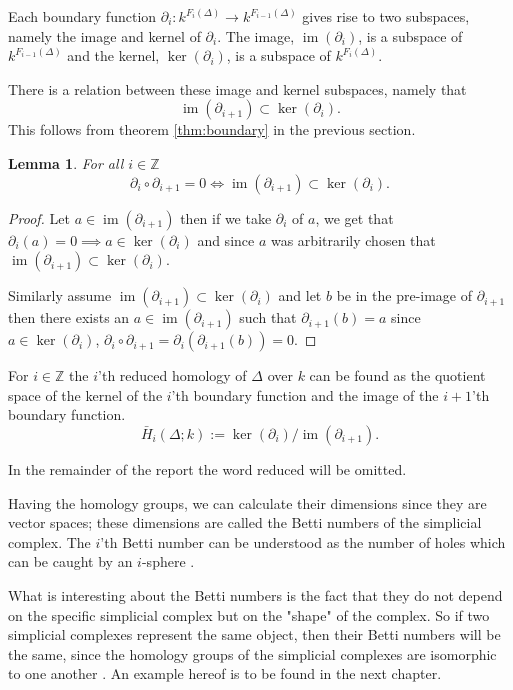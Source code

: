 \documentclass[11pt,a4paper,twoside]{report}
\newtheorem{mylem}[mythm]{Lemma}
\DeclareMathOperator{\im}{im}
\begin{document}
Each boundary function $\partial_i:k^{F_i(\Delta)}\to k^{F_{i-1}(\Delta)}$ gives rise to two subspaces, namely the image and kernel of $\partial_i$. The image, $\im(\partial_i)$, is a subspace of $k^{F_{i-1}(\Delta)}$ and the kernel, $\ker(\partial_i)$, is a subspace of $k^{F_{i}(\Delta)}$. 

There is a relation between these image and kernel subspaces, namely that 
\begin{equation*}
\im(\partial_{i+1})\subset\ker(\partial_i).
\end{equation*}
This follows from theorem \ref{thm:boundary} in the previous section.
\begin{mylem}\label{lem:subset}
For all $i\in\mathbb{Z}$ 
\begin{equation*}
\partial_i\circ\partial_{i+1}=0 \Leftrightarrow \im(\partial_{i+1})\subset\ker(\partial_i).
\end{equation*}
\end{mylem}
\begin{proof}
Let $a\in \im(\partial_{i+1})$ then if we take $\partial_i$ of $a$, we get that $\partial_i(a)=0\implies a\in \ker(\partial_i)$ and since $a$ was arbitrarily chosen that $\im(\partial_{i+1})\subset \ker(\partial_i)$. 

Similarly assume $\im(\partial_{i+1})\subset \ker(\partial_i)$ and let $b$ be in the pre-image of $\partial_{i+1}$ then there exists an $a\in\im(\partial_{i+1})$ such that 
$\partial_{i+1}(b)=a$ since $a\in\ker(\partial_i)$, $\partial_i\circ\partial_{i+1}=\partial_i(\partial_{i+1}(b))=0$. 
\end{proof}


For $i\in\mathbb{Z}$ the $i$'th reduced homology of $\Delta$ over $k$ can be found as the quotient space of the kernel of the $i$'th boundary function and the image of the $i+1$'th boundary function. \cite[p.2]{Allgaier}
\begin{equation}
\bar{H}_i(\Delta;k):=\ker(\partial_i)/\im(\partial_{i+1}).
\end{equation}

In the remainder of the report the word reduced will be omitted.

Having the homology groups, we can calculate their dimensions since they are vector spaces; these dimensions are called the Betti numbers of the simplicial complex. The $i$'th Betti number can be understood as the number of holes which can be caught by an $i$-sphere \cite{wikiBetti}.

What is interesting about the Betti numbers is the fact that they do not depend on the  specific simplicial complex but on the "shape" of the complex. So if two simplicial complexes represent the same object, then their Betti numbers will be the same, since the homology groups of the simplicial complexes are isomorphic to one another \cite[p. 70]{Edelsbrunner}. An example hereof is to be found in the next chapter.
\end{document}
